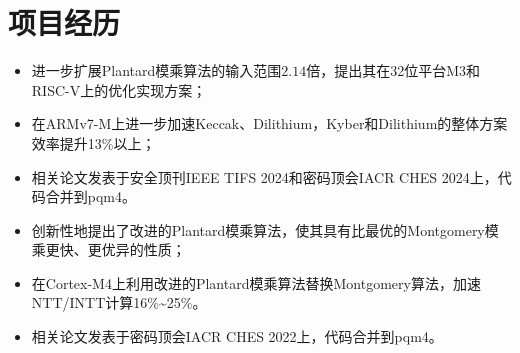 \documentclass[UTF8,AutoFakeBold]{resume}
\begin{document}
\section{\hspace{0.25em}\makebox[0.75em][c]{\faGithub} \fangsong\textbf{项目经历}}
    \begin{itemize}
      \item \kaishu 进一步扩展Plantard模乘算法的输入范围$2.14$倍，提出其在32位平台M3和RISC-V上的优化实现方案；
      \item \kaishu 在ARMv7-M上进一步加速Keccak、Dilithium，Kyber和Dilithium的整体方案效率提升13\%以上；
      \item \kaishu 相关论文发表于安全顶刊IEEE TIFS 2024和密码顶会IACR CHES 2024上，代码合并到pqm4。
    \end{itemize}
    \begin{itemize}
      \item \kaishu 创新性地提出了改进的Plantard模乘算法，使其具有比最优的Montgomery模乘更快、更优异的性质；
      \item \kaishu 在Cortex-M4上利用改进的Plantard模乘算法替换Montgomery算法，加速NTT/INTT计算16\%\textasciitilde 25\%。
      \item \kaishu 相关论文发表于密码顶会IACR CHES 2022上，代码合并到pqm4。
    \end{itemize}

\vspace{2mm}
\end{document}
